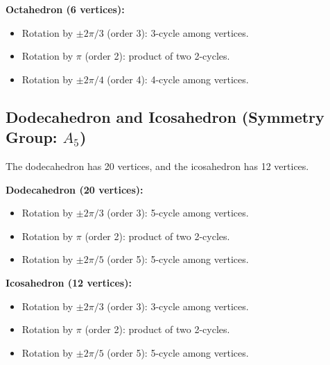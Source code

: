 \documentclass[12pt]{amsart}
\theoremstyle{definition}
\numberwithin{equation}{section}
\begin{document}
\begin{exercise}{1}
    \textbf{Octahedron (6 vertices):}
    \begin{itemize}
        \item Rotation by \(\pm 2\pi/3\) (order 3): 3-cycle among vertices.
        \item Rotation by \(\pi\) (order 2): product of two 2-cycles.
        \item Rotation by \(\pm 2\pi/4\) (order 4): 4-cycle among vertices.
    \end{itemize}

    \subsection*{Dodecahedron and Icosahedron (Symmetry Group: \(A_5\))}

    The dodecahedron has 20 vertices, and the icosahedron has 12 vertices. 

    \textbf{Dodecahedron (20 vertices):}
    \begin{itemize}
        \item Rotation by \(\pm 2\pi/3\) (order 3): 5-cycle among vertices.
        \item Rotation by \(\pi\) (order 2): product of two 2-cycles.
        \item Rotation by \(\pm 2\pi/5\) (order 5): 5-cycle among vertices.
    \end{itemize}

    \textbf{Icosahedron (12 vertices):}
    \begin{itemize}
        \item Rotation by \(\pm 2\pi/3\) (order 3): 3-cycle among vertices.
        \item Rotation by \(\pi\) (order 2): product of two 2-cycles.
        \item Rotation by \(\pm 2\pi/5\) (order 5): 5-cycle among vertices.
    \end{itemize}
\end{exercise}
\newpage
\end{document}
